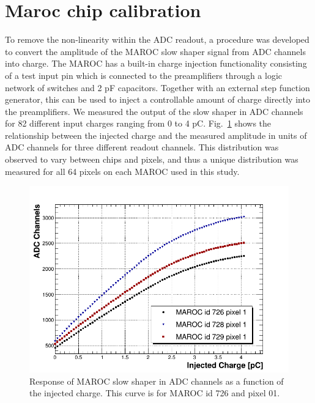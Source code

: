 \section{Maroc chip calibration}

To remove the non-linearity within the ADC readout, a procedure was developed to convert the amplitude of the MAROC slow shaper signal from ADC channels into charge. The MAROC has a built-in charge injection functionality consisting of a test input pin which is connected to the preamplifiers through a logic network of switches and 2 pF capacitors. Together with an external step function generator, this can be used to inject a controllable amount of charge directly into the preamplifiers. We measured the output of the slow shaper in ADC channels for 82 different input charges ranging from 0 to 4 pC. Fig.~\ref{fig:MAROCcalib} shows the relationship between the injected charge and the measured amplitude in units of ADC channels for three different readout channels. This distribution was observed to vary between chips and pixels, and thus a unique distribution was measured for all 64 pixels on each MAROC used in this study. 

\begin{figure}[hbt]
	\centering
	\includegraphics[width=\linewidth]{figures/adc_v_charge.png}
	\caption{Response of MAROC slow shaper in ADC channels as a function of the injected charge. This curve is for MAROC id 726 and pixel 01.}
	\label{fig:MAROCcalib}
\end{figure}

